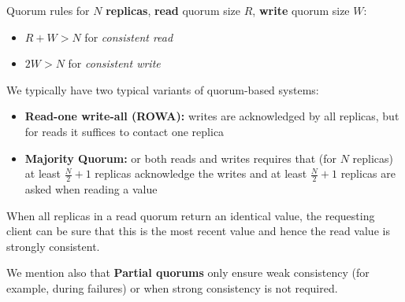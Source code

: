 Quorum rules for $N$ \textbf{replicas}, \textbf{read} quorum size $R$, \textbf{write} quorum size $W$:
\begin{itemize}
    \item $R + W > N$ for \textit{consistent read}
    \item $2W > N$ for \textit{consistent write}
\end{itemize}

We typically have two typical variants of quorum-based systems:
\begin{itemize}
    \item \textbf{Read-one write-all (ROWA):} writes are acknowledged by all replicas, but for reads it suffices to contact one replica
    \item \textbf{Majority Quorum:} or both reads and writes requires that (for $N$ replicas) at least $\frac{N}{2} + 1$ replicas acknowledge the writes and at least $\frac{N}{2} + 1$ replicas are asked when reading a value
\end{itemize}
When all replicas in a read quorum return an identical value, the requesting client can be sure that this is the most recent value and hence the read value is strongly consistent.

We mention also that \textbf{Partial quorums} only ensure weak consistency (for example, during failures) or when strong consistency is not
required.